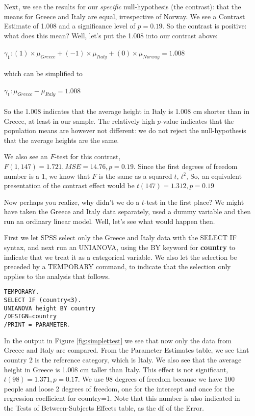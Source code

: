 Next, we see the results for our \textit{specific} null-hypothesis (the contrast): that the means for Greece and Italy are equal, irrespective of Norway. We see a Contrast Estimate of 1.008 and a significance level of $p=0.19$. So the contrast is positive: what does this mean? Well, let's put the 1.008 into our contrast above:
\\
\\
$\gamma_1: (1)\times \mu_{Greece} + (-1) \times \mu_{Italy} + (0) \times \mu_{Norway} = 1.008$
\\
\\
which can be simplified to
\\
\\
$\gamma_1:  \mu_{Greece} - \mu_{Italy}  =  1.008$
\\
\\
So the 1.008 indicates that the average height in Italy is 1.008 cm shorter than in Greece, at least in our sample. The relatively high $p$-value indicates that the population means are however not different: we do not reject the null-hypothesis that the average heights are the same.

We also see an $F$-test for this contrast, $F(1, 147)=1.721, MSE= 14.76, p=0.19$.
Since the first degrees of freedom number is a 1, we know that $F$ is the same as a squared $t$, $t^2$, So, an equivalent presentation of the contrast effect would be $t(147)=1.312, p=0.19$

Now perhaps you realize, why didn't we do a $t$-test in the first place? We might have taken the Greece and Italy data separately, used a dummy variable and then run an ordinary linear model. Well, let's see what would happen then.

First we let SPSS select only the Greece and Italy data with the SELECT IF syntax, and next run an UNIANOVA, using the BY keyword for \textbf{country} to indicate that we treat it as a categorical variable. We also let the selection be preceded by a TEMPORARY command, to indicate that the selection only applies to the analysis that follows.

\begin{verbatim}
TEMPORARY.
SELECT IF (country<3).
UNIANOVA height BY country
/DESIGN=country
/PRINT = PARAMETER.  
\end{verbatim}


In the output in Figure \ref{fig:simplettest} we see that now only the data from Greece and Italy are compared. From the Parameter Estimates table, we see that country 2 is the reference category, which is Italy. We also see that the average height in Greece is 1.008 cm taller than Italy. This effect is not significant, $t(98)=1.371,p=0.17$. We use 98 degrees of freedom because we have 100 people and loose 2 degrees of freedom, one for the intercept and once for the regression coefficient for country=1. Note that this number is also indicated in the Tests of Between-Subjects Effects table, as the df of the Error.

